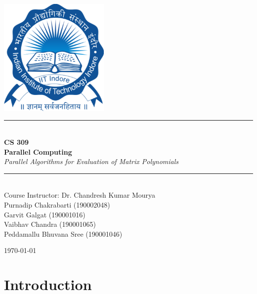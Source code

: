 \documentclass[12pt,a4paper]{article}
\newcommand{\HRule}{\rule{\linewidth}{0.5mm}}
\begin{document}
\begin{titlepage}
\begin{center}

\includegraphics[width=0.40\textwidth]{Indian_Institute_of_Technology,_Indore_Logo.png}~\\[2cm]


\HRule \\[0.4cm]
{ \LARGE 
  \textbf{CS 309 \\ Parallel Computing}\\[0.4cm]
  \emph{Parallel Algorithms for Evaluation of Matrix Polynomials}\\[0.4cm]
}
\HRule \\[1.5cm]



{ \large
  Course Instructor: Dr. Chandresh Kumar Mourya\\[0.8cm]
  Purnadip Chakrabarti (190002048) \\[0.1cm]
  Garvit Galgat (190001016) \\[0.1cm] 
  Vaibhav Chandra (190001065) \\[0.1cm]
  Peddamallu Bhuvana Sree (190001046) \\[0.1cm]
}

\vfill


{\large \today}
 
\end{center}
\end{titlepage}

\newpage

\tableofcontents
{}
\newpage
\setcounter{page}{1}

\section{Introduction}\label{sec:intro}
\end{document}
